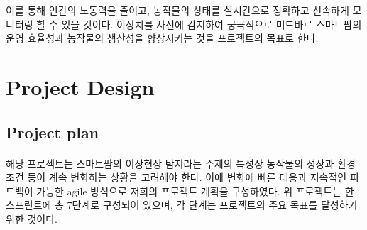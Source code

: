 \documentclass[11pt]{article}
\begin{document}
이를 통해 인간의 노동력을 줄이고, 농작물의 상태를 실시간으로 정확하고 신속하게 모니터링 할 수 있을 것이다. 이상치를 사전에 감지하여 궁극적으로 미드바르 스마트팜의 운영 효율성과 농작물의 생산성을 향상시키는 것을 프로젝트의 목표로 한다.


    \section{Project Design}
    \subsection{Project plan}   
    
\paragraph{} 해당 프로젝트는 스마트팜의 이상현상 탐지라는 주제의 특성상 농작물의 성장과 환경 조건 등이 계속 변화하는 상황을 고려해야 한다. 이에 변화에 빠른 대응과 지속적인 피드백이 가능한 agile 방식으로 저희의 프로젝트 계획을 구성하였다.
위 프로젝트는 한 스프린트에 총 7단계로 구성되어 있으며, 각 단계는 프로젝트의 주요 목표를 달성하기 위한 것이다.
\end{document}
